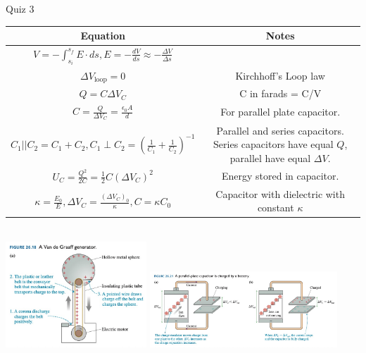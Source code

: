 \documentclass{article}
\newcommand{\eps}{\epsilon_0}
\begin{document}
\begin{section}{Quiz 3}
 \begin{tabular}{|c|c|}
	 \hline
	 Equation                                                                                        & Notes                                                                       \\
	 \hline

	 $V = - \int_{s_i}^{s_f} E \cdot ds, E = - \frac{dV}{ds} \approx - \frac{\Delta V}{\Delta s}   $ &                                                                             \\

	 $\Delta V_\text{loop} = 0 $                                                                     & Kirchhoff's Loop law                                                        \\

	 $Q = C \Delta V_C$                                                                              & C in farads = C/V                                                           \\

	 $C = \frac{Q}{\Delta V_C} = \frac{\eps A}{d}$                                                   & For parallel plate capacitor.                                               \\

	 $C_1 || C_2 = C_1 + C_2, C_1 \perp C_2 = (\frac{1}{C_1} + \frac{1}{C_2})^{-1}$                  & \makecell{Parallel and series capacitors. Series capacitors have equal $Q$, \\ parallel have equal $\Delta V$.} \\

	 $U_C = \frac{Q^2}{2 C} = \frac{1}{2} C (\Delta V_C)^2$                                          & Energy stored in capacitor.                                                 \\
	 $\kappa = \frac{E_0}{E}, \Delta V_C = \frac{(\Delta V_C)_0}{\kappa}, C = \kappa C_0$            & Capacitor with dielectric with constant $\kappa$                            \\

	 \hline
 \end{tabular}
 \\
 \includegraphics[width=150pt]{final_cheet_sheet_resources/gvotcdmxjpwdvcicmenhqcknyxedpudu.jpg}
 \includegraphics[width=200pt]{final_cheet_sheet_resources/khlzwxxfhkebtizrrtyhiwmbjhtfbalk.jpg}
\end{section}
\end{document}
